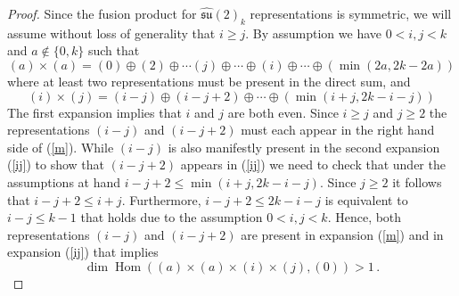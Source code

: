 \documentclass[a4paper,11pt]{article}
\theoremstyle{plain}
\theoremstyle{definition}
\def\be{\begin{equation}}
\def\ee{\end{equation}}
\begin{document}
\begin{proof}
Since the fusion product for  $\widehat{\mathfrak{su}}(2)_k$ representations is symmetric, we will assume without loss of generality that $i\geq j$. 
By assumption we have  $0<i,j<k$ 
and $a\notin\{0,k\}$ such that   %
\begin{equation}\label{m}
        (a)\times(a)=(0)\oplus (2)\oplus\cdots(j)\oplus\cdots\oplus (i)\oplus\cdots \oplus \left(\operatorname{min}(2a,2k-2a)\right)
    \end{equation}
    where at least two representations must be present in the direct sum, 
    and
    \begin{equation}\label{ij}
        (i)\times(j)= (i-j)\oplus (i-j+2)\oplus\cdots \oplus \left(\operatorname{min}(i+j,2k-i-j)\right)
    \end{equation}
    The first expansion implies that  $i$ and $j$ are both even. Since $i\ge j$ and $j\ge 2$ the representations $(i-j)$ and $(i-j+2)$ must each appear in the right hand side of (\ref{m}). 
    While $(i-j)$ is also manifestly  present in the second expansion (\ref{ij}) to show that $(i-j+2)$ appears in (\ref{ij}) we need to check that under the assumptions at hand $i-j+2 \le \operatorname{min}(i+j,2k-i-j)$. Since $j\ge 2$ it follows that $i-j+2 \le i + j$. Furthermore, $i-j+2 \le 2k-i-j$ is equivalent to $i-j\le k-1$ that holds 
    due to the assumption $0<i,j<k$.   Hence, both representations $(i-j)$ and $(i-j+2)$ are present in expansion (\ref{m}) and in expansion (\ref{ij}) that implies 
    \be
     \operatorname{dim}\operatorname{Hom}\left((a)\times(a)\times(i)\times(j),(0)\right) >1 \, .
    \ee
   

\end{proof}
\end{document}
